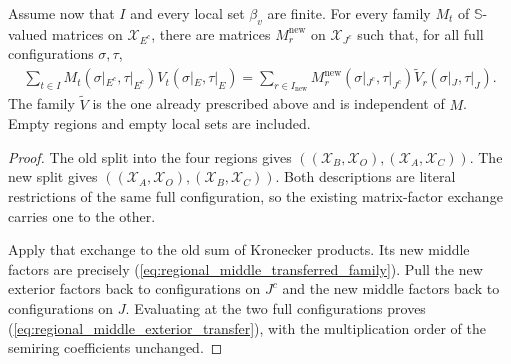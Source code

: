 \begin{lemma}
    \label{thm:regional_middle_exterior_transfer}
    \leanok
    Assume now that $I$ and every local set $\beta_v$ are finite.
    For every family $M_t$ of $\mathbb S$-valued matrices on
    $\mathcal X_{E^c}$, there are matrices $M^{\mathrm{new}}_r$ on
    $\mathcal X_{J^c}$ such that, for all full configurations $\sigma,\tau$,
    \begin{align}
        \sum_{t\in I}M_t(\sigma|_{E^c},\tau|_{E^c})
        V_t(\sigma|_E,\tau|_E)
        =\sum_{r\in I_{\mathrm{new}}}
        M^{\mathrm{new}}_r(\sigma|_{J^c},\tau|_{J^c})
        \widetilde V_r(\sigma|_J,\tau|_J).
        \label{eq:regional_middle_exterior_transfer}
    \end{align}
    The family $\widetilde V$ is the one already prescribed above and is
    independent of $M$. Empty regions and empty local sets are included.
\end{lemma}
\begin{proof}\leanok
    The old split into the four regions gives $((\mathcal X_B,\mathcal X_O),(\mathcal X_A,\mathcal X_C))$.
    The new split gives
    $((\mathcal X_A,\mathcal X_O),(\mathcal X_B,\mathcal X_C))$.
    Both descriptions are literal restrictions of the same full configuration,
    so the existing matrix-factor exchange carries one to the other.

    Apply that exchange to the old sum of Kronecker products. Its new middle
    factors are precisely (\ref{eq:regional_middle_transferred_family}).
    Pull the new exterior factors back to configurations on $J^c$ and the new
    middle factors back to configurations on $J$. Evaluating at the two full
    configurations proves (\ref{eq:regional_middle_exterior_transfer}), with
    the multiplication order of the semiring coefficients unchanged.
\end{proof}

